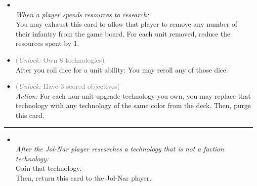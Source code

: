 \begin{multicols}{2}
\begin{itemize}
\item {}\\
\emph{When a player spends resources to research:}
\\
You may exhaust this card to allow that player to remove any number of their infantry from the game board. For each unit removed, reduce the resources spent by 1.
\item {} \textcolor{gray}{(\emph{Unlock:} Own 8 technologies)}\\
After you roll dice for a unit ability: You may reroll any of those dice.
\item {} \textcolor{gray}{(\emph{Unlock:} Have 3 scored objectives)}\\
\emph{Action:} For each non-unit upgrade technology you own, you may replace that technology with any technology of the same color from the deck. Then, purge this card. 
\end{itemize}

\vspace{-10pt}\rule{\hsize}{0.4pt}\vspace{5pt}


\begin{itemize}
\item {}\\
\emph{After the Jol-Nar player researches a technology that is not a faction technology:}\\
Gain that technology.\\
Then, return this card to the Jol-Nar player.
\end{itemize}

\end{multicols}



